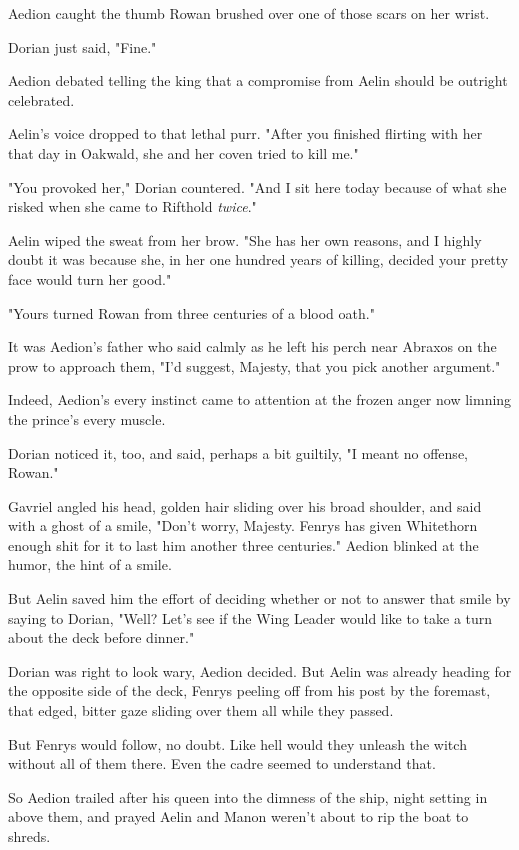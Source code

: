 Aedion caught the thumb Rowan brushed over one of those scars on her wrist.

Dorian just said, "Fine."

Aedion debated telling the king that a compromise from Aelin should be outright celebrated.

Aelin's voice dropped to that lethal purr.
"After you finished flirting with her that day in Oakwald, she and her coven tried to kill me."

"You provoked her," Dorian countered.
"And I sit here today because of what she risked when she came to Rifthold \emph{twice}."

Aelin wiped the sweat from her brow.
"She has her own reasons, and I highly doubt it was because she, in her one hundred years of killing, decided your pretty face would turn her good."

"Yours turned Rowan from three centuries of a blood oath."

It was Aedion's father who said calmly as he left his perch near Abraxos on the prow to approach them, "I'd suggest, Majesty, that you pick another argument."

Indeed, Aedion's every instinct came to attention at the frozen anger now limning the prince's every muscle.

Dorian noticed it, too, and said, perhaps a bit guiltily, "I meant no offense, Rowan."

Gavriel angled his head, golden hair sliding over his broad shoulder, and said with a ghost of a smile, "Don't worry, Majesty.
Fenrys has given Whitethorn enough shit for it to last him another three centuries."
Aedion blinked at the humor, the hint of a smile.

But Aelin saved him the effort of deciding whether or not to answer that smile by saying to Dorian, "Well?
Let's see if the Wing Leader would like to take a turn about the deck before dinner."

Dorian was right to look wary, Aedion decided.
But Aelin was already heading for the opposite side of the deck, Fenrys peeling off from his post by the foremast, that edged, bitter gaze sliding over them all while they passed.

But Fenrys would follow, no doubt.
Like hell would they unleash the witch without all of them there.
Even the cadre seemed to understand that.

So Aedion trailed after his queen into the dimness of the ship, night setting in above them, and prayed Aelin and Manon weren't about to rip the boat to shreds.

